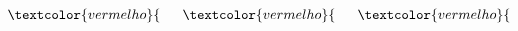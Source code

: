 \documentclass[10pt,a4paper]{beamer}
\begin{document}
\begin{frame}[t]
{\begin{columns}[t]
					\begin{column}{0.33 \textwidth}
						$\textcolor{vermelho}{slew_5} \gets \frac{slew_3}{1 - x_5(1 - e^{-\frac{1}{x_5}})}$
					\end{column}
					\begin{column}{0.33 \textwidth}
						$\textcolor{vermelho}{slew_6} \gets \frac{slew_3}{1 - x_6(1 - e^{-\frac{1}{x_6}})}$
					\end{column}
					\begin{column}{0.33 \textwidth}
						$\textcolor{vermelho}{slew_7} \gets \frac{slew_4}{1 - x_7(1 - e^{-\frac{1}{x_7}})}$
					\end{column}
				\end{columns}

			}

		\end{frame}
\end{document}
